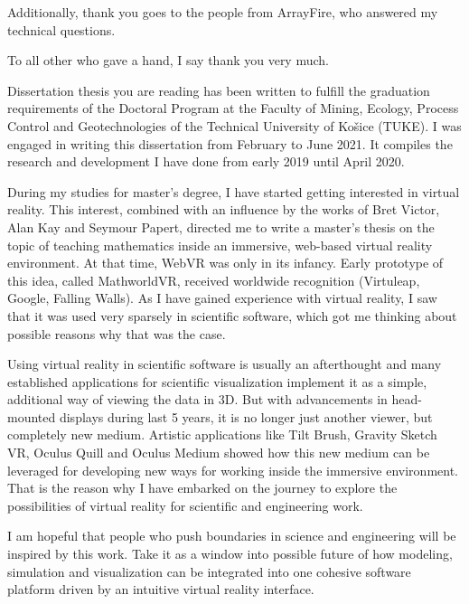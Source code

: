 \documentclass[]{tukethesis}
\begin{document}
Additionally, thank you goes to the people from ArrayFire, who answered my technical questions.

To all other who gave a hand, I say thank you
very much.
\endacknowledgement

\preface %
Dissertation thesis you are reading has been written to fulfill the graduation requirements of the Doctoral Program at the Faculty of Mining, Ecology, Process Control and Geotechnologies of the Technical University of Košice (TUKE). I was engaged in writing this dissertation from February to June 2021. It compiles the research and development I have done from early 2019 until April 2020.

During my studies for master's degree, I have started getting interested in virtual reality. This interest, combined with an influence by the works of Bret Victor, Alan Kay and Seymour Papert, directed me to write a master's thesis on the topic of teaching mathematics inside an immersive, web-based virtual reality environment. At that time, WebVR was only in its infancy. Early prototype of this idea, called MathworldVR, received worldwide recognition (Virtuleap, Google, Falling Walls). As I have gained experience with virtual reality, I saw that it was used very sparsely in scientific software, which got me thinking about possible reasons why that was the case.

Using virtual reality in scientific software is usually an afterthought and many established applications for scientific visualization implement it as a simple, additional way of viewing the data in 3D. But with advancements in head-mounted displays during last 5 years, it is no longer just another viewer, but completely new medium. Artistic applications like Tilt Brush, Gravity Sketch VR, Oculus Quill and Oculus Medium showed how this new medium can be leveraged for developing new ways for working inside the immersive environment. That is the reason why I have embarked on the journey to explore the possibilities of virtual reality for scientific and engineering work.

I am hopeful that people who push boundaries in science and engineering will be inspired by this work. Take it as a window into possible future of how modeling, simulation and visualization can be integrated into one cohesive software platform driven by an intuitive virtual reality interface.
\endpreface

\thispagestyle{empty}
\tableofcontents
\newpage

\thispagestyle{empty}
\listoffigures
\newpage
\end{document}
